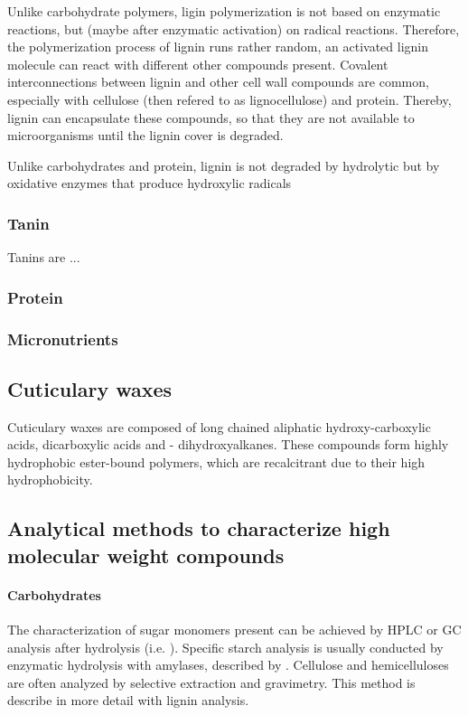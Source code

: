 Unlike carbohydrate polymers, ligin polymerization is not based on enzymatic reactions, but (maybe after enzymatic activation) on radical reactions. Therefore, the polymerization process of lignin runs rather random, an activated lignin molecule can react with different other compounds present. Covalent interconnections between lignin and other cell wall compounds are common, especially with cellulose (then refered to as lignocellulose) and protein. Thereby, lignin can encapsulate these compounds, so that they are not available to microorganisms until the lignin cover is degraded.

Unlike carbohydrates and protein, lignin is not degraded by hydrolytic but by oxidative enzymes that produce hydroxylic radicals

\subsubsection{Tanin}
Tanins are ...

\subsubsection{Protein}

\subsubsection{Micronutrients}

\subsection{Cuticulary waxes}
Cuticulary waxes are composed of long chained aliphatic \textomega hydroxy-carboxylic acids, dicarboxylic acids and \textalpha - \textomega dihydroxyalkanes. These compounds form highly hydrophobic ester-bound polymers, which are recalcitrant due to their high hydrophobicity. 

\subsection{Analytical methods to characterize high molecular weight compounds}

\paragraph{Carbohydrates}
The characterization of sugar monomers present can be achieved by HPLC or GC analysis after hydrolysis (i.e. \cite{Snajdr2011}). Specific starch analysis is usually conducted by enzymatic hydrolysis with amylases, described by \cite{Leitner2011}. Cellulose and hemicelluloses are  often analyzed by selective extraction and gravimetry. This method is describe in more detail with lignin analysis.

